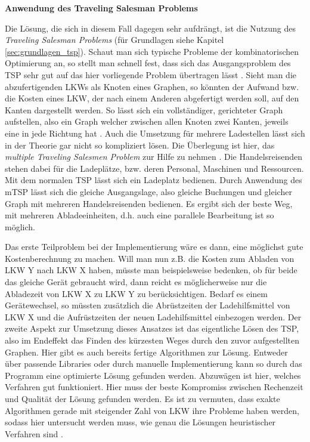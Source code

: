 \textbf{Anwendung des Traveling Salesman Problems}

Die Lösung, die sich in diesem Fall dagegen sehr aufdrängt, ist die Nutzung des \textit{Traveling Salesman Problems} (für Grundlagen siehe Kapitel \ref{sec:grundlagen_tsp}). Schaut man sich typische Probleme der kombinatorischen Optimierung an, so stellt man schnell fest, dass sich das Ausgangsproblem des TSP sehr gut auf das hier vorliegende Problem übertragen lässt \cite{kombinatorischeOptimierung}. Sieht man die abzufertigenden LKWs als Knoten eines Graphen, so könnten der Aufwand bzw. die Kosten eines LKW, der nach einem Anderen abgefertigt werden soll, auf den Kanten dargestellt werden. So lässt sich ein vollständiger, gerichteter Graph aufstellen, also ein Graph welcher zwischen allen Knoten zwei Kanten, jeweils eine in jede Richtung hat \cite{graphenEckenKanten}. Auch die Umsetzung für mehrere Ladestellen lässt sich in der Theorie gar nicht so kompliziert lösen. Die Überlegung ist hier, das \textit{multiple Traveling Salesmen Problem} zur Hilfe zu nehmen \cite{mtsp}. Die Handelsreisenden stehen dabei für die Ladeplätze, bzw. deren Personal, Maschinen und Ressourcen. Mit dem normalen TSP lässt sich ein Ladeplatz bedienen. Durch Anwendung des mTSP lässt sich die gleiche Ausgangslage, also gleiche Buchungen und gleicher Graph mit mehreren Handelsreisenden bedienen. Es ergibt sich der beste Weg, mit mehreren Abladeeinheiten, d.h. auch eine parallele Bearbeitung ist so möglich.

Das erste Teilproblem bei der Implementierung wäre es dann, eine möglichst gute Kostenberechnung zu machen. Will man nun z.B. die Kosten zum Abladen von LKW Y nach LKW X haben, müsste man beispielsweise bedenken, ob für beide das gleiche Gerät gebraucht wird, dann reicht es möglicherweise nur die Abladezeit von LKW X zu LKW Y zu berücksichtigen. Bedarf es einem Gerätewechsel, so müssten zusätzlich die Abrüstzeiten der Ladehilfsmittel von LKW X und die Aufrüstzeiten der neuen Ladehilfsmittel einbezogen werden. Der zweite Aspekt zur Umsetzung dieses Ansatzes ist das eigentliche Lösen des TSP, also im Endeffekt das Finden des kürzesten Weges durch den zuvor aufgestellten Graphen. Hier gibt es auch bereits fertige Algorithmen zur Lösung. Entweder über passende Libraries oder durch manuelle Implementierung kann so durch das Programm eine optimierte Lösung gefunden werden. Abzuwägen ist hier, welches Verfahren gut funktioniert. Hier muss der beste Kompromiss zwischen Rechenzeit und Qualität der Lösung gefunden werden. Es ist zu vermuten, dass exakte Algorithmen gerade mit steigender Zahl von LKW ihre Probleme haben werden, sodass hier untersucht werden muss, wie genau die Lösungen heuristischer Verfahren sind \cite{oracleTsp}.

